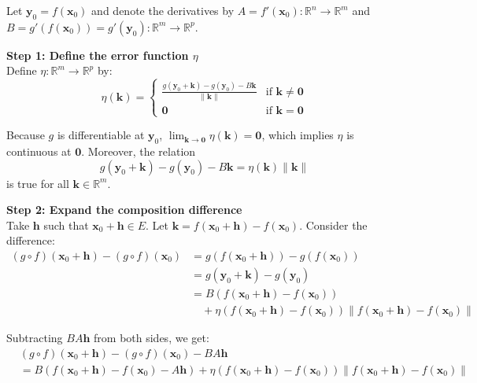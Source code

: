 \begin{pfbox}

Let $\mathbf{y}_0 = f(\mathbf{x}_0)$ and denote the derivatives by $A = f'(\mathbf{x}_0): \mathbb{R}^n \to \mathbb{R}^m$ and $B = g'(f(\mathbf{x}_0)) = g'(\mathbf{y}_0): \mathbb{R}^m \to \mathbb{R}^p$.

\vspace{0.8em}
\noindent \textbf{Step 1: Define the error function $\eta$} \\
Define $\eta: \mathbb{R}^m \to \mathbb{R}^p$ by:
$$
\eta(\mathbf{k}) = 
\begin{cases}
\frac{g(\mathbf{y}_0+\mathbf{k}) - g(\mathbf{y}_0) - B\mathbf{k}}{\|\mathbf{k}\|} & \text{if } \mathbf{k} \ne \mathbf{0} \\
\mathbf{0} & \text{if } \mathbf{k} = \mathbf{0}
\end{cases}
$$ 

Because $g$ is differentiable at $\mathbf{y}_0$, $\lim_{\mathbf{k} \to \mathbf{0}} \eta(\mathbf{k}) = \mathbf{0}$, which implies $\eta$ is continuous at $\mathbf{0}$.
Moreover, the relation
$$g(\mathbf{y}_0+\mathbf{k}) - g(\mathbf{y}_0) - B\mathbf{k} = \eta(\mathbf{k}) \|\mathbf{k}\|$$
is true for all $\mathbf{k} \in \mathbb{R}^m$.

\vspace{0.8em}
\noindent \textbf{Step 2: Expand the composition difference} \\
Take $\mathbf{h}$ such that $\mathbf{x}_0+\mathbf{h} \in E$. Let $\mathbf{k} = f(\mathbf{x}_0+\mathbf{h}) - f(\mathbf{x}_0)$.
Consider the difference:
\begin{align*}
(g \circ f)(\mathbf{x}_0+\mathbf{h}) - (g \circ f)(\mathbf{x}_0) 
&= g(f(\mathbf{x}_0+\mathbf{h})) - g(f(\mathbf{x}_0)) \\
&= g(\mathbf{y}_0+\mathbf{k}) - g(\mathbf{y}_0) \\
&= B(f(\mathbf{x}_0+\mathbf{h}) - f(\mathbf{x}_0)) \\
&\quad + \eta(f(\mathbf{x}_0+\mathbf{h}) - f(\mathbf{x}_0)) \|f(\mathbf{x}_0+\mathbf{h}) - f(\mathbf{x}_0)\|
\end{align*}

Subtracting $BA\mathbf{h}$ from both sides, we get:
\begin{align*}
&(g \circ f)(\mathbf{x}_0+\mathbf{h}) - (g \circ f)(\mathbf{x}_0) - BA\mathbf{h} \\
&= B(f(\mathbf{x}_0+\mathbf{h}) - f(\mathbf{x}_0) - A\mathbf{h}) + \eta(f(\mathbf{x}_0+\mathbf{h}) - f(\mathbf{x}_0)) \|f(\mathbf{x}_0+\mathbf{h}) - f(\mathbf{x}_0)\|
\end{align*} 


\end{pfbox}
